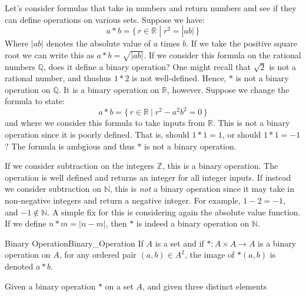     \begin{example}
        Let's consider formulas that take in numbers and return numbers and see
        if they can define operations on various sets. Suppose we have:
        \begin{equation}
            a*b=\{\,r\in\mathbb{R}\;|\;r^{2}=|ab|\,\}
        \end{equation}
        Where $|ab|$ denotes the absolute value of $a$ times $b$. If we take the
        positive square root we can write this as $a*b=\sqrt{|ab|}$. If we
        consider this formula on the rational numbers $\mathbb{Q}$, does it
        define a binary operation? One might recall that $\sqrt{2}$ is not a
        rational number, and thushus $1*2$ is not well-defined. Hence, $*$ is
        not a binary operation on $\mathbb{Q}$. It is a binary operation on
        $\mathbb{R}$, however. Suppose we change the formula to state:
        \begin{equation}
            a*b=\{\,r\in\mathbb{R}\:|\;r^{2}-a^{2}b^{2}=0\,\}
        \end{equation}
        and where we consider this formula to take inputs from $\mathbb{R}$.
        This is not a binary operation since it is poorly defined. That is,
        should $1*1=1$, or should $1*1=\minus{1}$? The formula is ambgious and
        thus $*$ is not a binary operation.
    \end{example}
    \begin{example}
        If we consider subtraction on the integers $\mathbb{Z}$, this is a
        binary operation. The operation is well defined and returns an integer
        for all integer inputs. If instead we consider subtraction on
        $\mathbb{N}$, this is \textit{not} a binary operation since it may take
        in non-negative integers and return a negative integer. For example,
        $1-2=\minus{1}$, and $\minus{1}\notin\mathbb{N}$. A simple fix for this
        is considering again the absolute value function. If we define
        $n*m=|n-m|$, then $*$ is indeed a binary operation on $\mathbb{N}$.
    \end{example}
    \begin{fnotation}{Binary Operation}{Binary_Operation}
        If $A$ is a set and if $*:A\times{A}\rightarrow{A}$ is a binary
        operation on $A$, for any ordered pair $(a,b)\in{A}^{2}$, the image
        of $*(a,b)$ is denoted $a*b$.
    \end{fnotation}
    Given a binary operation $*$ on a set $A$, and given three distinct elements
